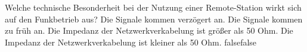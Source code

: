     {Welche technische Besonderheit bei der Nutzung einer Remote-Station wirkt sich auf den Funkbetrieb aus?}
    {Die Signale kommen verzögert an.}
    {Die Signale kommen zu früh an.}
    {Die Impedanz der Netzwerkverkabelung ist größer als 50 Ohm.}
    {Die Impedanz der Netzwerkverkabelung ist kleiner als 50 Ohm.}
    {false}{false}